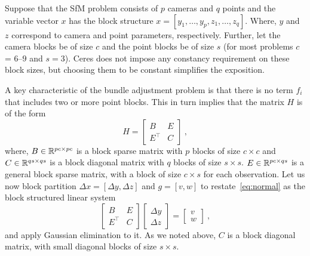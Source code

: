 Suppose that the SfM problem consists of $p$ cameras and $q$ points and the variable vector $x$ has the  block structure $x = [y_{1},\hdots,y_{p},z_{1},\hdots,z_{q}]$. Where, $y$ and $z$ correspond to camera and point parameters, respectively.  Further, let the camera blocks be of size $c$ and the point blocks be of size $s$ (for most problems $c$ =  $6$--$9$ and $s = 3$). Ceres does not impose any constancy requirement on these block sizes, but choosing them to be constant simplifies the exposition.

A key characteristic of the bundle adjustment problem is that there is no term $f_{i}$ that includes two or more point blocks.  This in turn implies that the matrix $H$ is of the form
\begin{equation}
        H =  \left[
                \begin{matrix} B & E\\ E^\top & C
                \end{matrix}
                \right]\ ,
\label{eq:hblock}
\end{equation}
where, $B \in \mathbb{R}^{pc\times pc}$ is a block sparse matrix with $p$ blocks of size $c\times c$ and  $C \in \mathbb{R}^{qs\times qs}$ is a block diagonal matrix with $q$ blocks of size $s\times s$. $E \in \mathbb{R}^{pc\times qs}$ is a general block sparse matrix, with a block of size $c\times s$ for each observation. Let us now block partition $\Delta x = [\Delta y,\Delta z]$ and $g=[v,w]$ to restate~\eqref{eq:normal} as the block structured linear system
\begin{equation}
        \left[
                \begin{matrix} B & E\\ E^\top & C
                \end{matrix}
                \right]\left[
                        \begin{matrix} \Delta y \\ \Delta z
                        \end{matrix}
                        \right]
                        =
                        \left[
                                \begin{matrix} v\\ w
                                \end{matrix}
                                \right]\ ,
\label{eq:linear2}
\end{equation}
and apply Gaussian elimination to it. As we noted above, $C$ is a block diagonal matrix, with small diagonal blocks of size $s\times s$.
